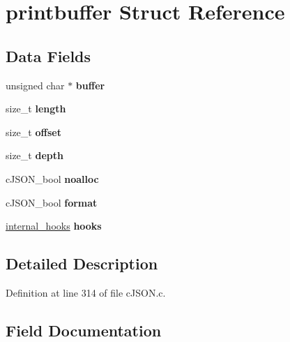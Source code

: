 \hypertarget{structprintbuffer}{}\section{printbuffer Struct Reference}
\label{structprintbuffer}
\subsection*{Data Fields}
\begin{DoxyCompactItemize}
\item 
\mbox{\label{structprintbuffer_a754f63618e91db99f7ab6cfc4e629013}} 
unsigned char $\ast$ {\bfseries buffer}
\item 
\mbox{\label{structprintbuffer_a1a679f8b6fe9b413fb3a87203b0f5bc8}} 
size\+\_\+t {\bfseries length}
\item 
\mbox{\label{structprintbuffer_a3ed6f9d24d6591047680492a962dc7c9}} 
size\+\_\+t {\bfseries offset}
\item 
\mbox{\label{structprintbuffer_aa7311b5da38ff8d1737824c611b48732}} 
size\+\_\+t {\bfseries depth}
\item 
\mbox{\label{structprintbuffer_aa2a7966b71dc3535e4e3789c33ec5368}} 
c\+J\+S\+O\+N\+\_\+bool {\bfseries noalloc}
\item 
\mbox{\label{structprintbuffer_a75d3f480f5308e7f4afecf30e11277ef}} 
c\+J\+S\+O\+N\+\_\+bool {\bfseries format}
\item 
\mbox{\label{structprintbuffer_a43a8b3bcc644432f12f5aed5159d2520}} 
\hyperlink{structinternal__hooks}{internal\+\_\+hooks} {\bfseries hooks}
\end{DoxyCompactItemize}


\subsection{Detailed Description}


Definition at line 314 of file c\+J\+S\+O\+N.\+c.



\subsection{Field Documentation}
\mbox{\label{structprintbuffer_a754f63618e91db99f7ab6cfc4e629013}} 
